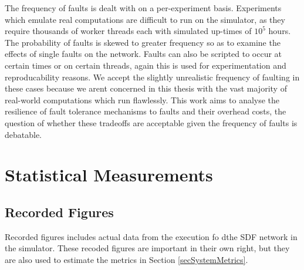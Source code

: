 The frequency of faults is dealt with on a per-experiment basis.
Experiments which emulate real computations are difficult to run on the simulator, as they require thousands of worker threads each with simulated up-times of $10^5$ hours.
The probability of faults is skewed to greater frequency so as to examine the effects of single faults on the network.
Faults can also be scripted to occur at certain times or on certain threads, again this is used for experimentation and reproducability reasons.
We accept the slightly unrealistic frequency of faulting in these cases because we arent concerned in this thesis with the vast majority of real-world computations which run flawlessly.
This work aims to analyse the resilience of fault tolerance mechanisms to faults and their overhead costs, the question of whether these tradeoffs are acceptable given the frequency of faults is debatable.

\section{Statistical Measurements}
\label{secSystemStatistics}
\subsection{Recorded Figures}

Recorded figures includes actual data from the execution fo dthe SDF network in the simulator.
These recoded figures are important in their own right, but they are also used to estimate the metrics in Section \ref{secSystemMetrics}.


